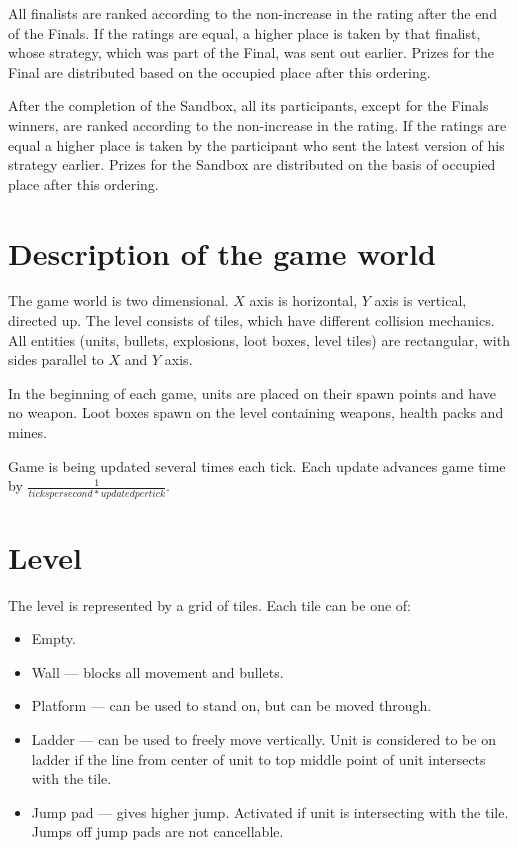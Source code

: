 All finalists are ranked according to the non-increase in the rating after the end of the Finals. If the ratings are equal, a higher place is taken by that finalist, whose strategy, which was part of the Final, was sent out earlier. Prizes for the Final are distributed based on the occupied place after this
ordering.

After the completion of the Sandbox, all its participants, except for the Finals winners, are ranked according to the non-increase in the rating. If the ratings are equal 
a higher place is taken by the participant who sent the latest version of his strategy earlier. Prizes for the Sandbox are distributed on the basis of
occupied place after this ordering.

\section{Description of the game world}

The game world is two dimensional.
$X$ axis is horizontal, $Y$ axis is vertical, directed up.
The level consists of tiles, which have different collision mechanics.
All entities (units, bullets, explosions, loot boxes, level tiles) are rectangular, with sides parallel to $X$ and $Y$ axis.

In the beginning of each game, units are placed on their spawn points and have no weapon.
Loot boxes spawn on the level containing weapons, health packs and mines.

Game is being updated several times each tick.
Each update advances game time by $\frac{1}{ticks per second * updated per tick}$.

\section{Level}

The level is represented by a grid of tiles. Each tile can be one of:
\begin{itemize}
      \item Empty.
      \item Wall --- blocks all movement and bullets.
      \item Platform --- can be used to stand on, but can be moved through.
      \item Ladder --- can be used to freely move vertically.
            Unit is considered to be on ladder if the line from center of unit to top middle point of unit intersects with the tile.
      \item Jump pad --- gives higher jump. Activated if unit is intersecting with the tile.
            Jumps off jump pads are not cancellable.
\end{itemize}


